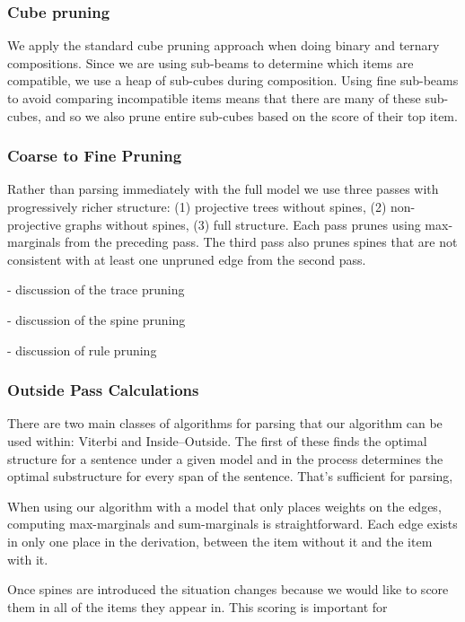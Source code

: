 \subsubsection{Cube pruning}
\parencite{Chiang:2007}

We apply the standard cube pruning approach when doing binary and ternary compositions.
Since we are using sub-beams to determine which items are compatible, we use a heap of sub-cubes during composition.
Using fine sub-beams to avoid comparing incompatible items means that there are many of these sub-cubes, and so we also prune entire sub-cubes based on the score of their top item.

\subsubsection{Coarse to Fine Pruning}
\parencite{Goodman:1997}
Rather than parsing immediately with the full model we use three passes with progressively richer structure:
(1) projective trees without spines,
(2) non-projective graphs without spines,
(3) full structure.
Each pass prunes using max-marginals from the preceding pass.
The third pass also prunes spines that are not consistent with at least one unpruned edge from the second pass.

 - discussion of the trace pruning

 - discussion of the spine pruning

 - discussion of rule pruning

\subsubsection{Outside Pass Calculations}

There are two main classes of algorithms for parsing that our algorithm can be used within: Viterbi and Inside--Outside.
The first of these finds the optimal structure for a sentence under a given model and in the process determines the optimal substructure for every span of the sentence.
That's sufficient for parsing, 


When using our algorithm with a model that only places weights on the edges, computing max-marginals and sum-marginals is straightforward.
Each edge exists in only one place in the derivation, between the item without it and the item with it.

Once spines are introduced the situation changes because we would like to score them in all of the items they appear in.
This scoring is important for


